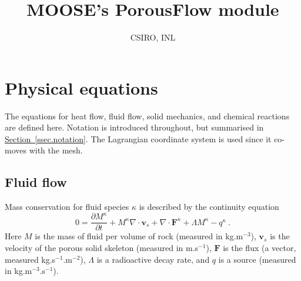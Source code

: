 \documentclass[12pt]{report}
\def\species{\kappa}
\def\flux{\mathbf{F}}
\begin{document}
\title{MOOSE's PorousFlow module}


\author{CSIRO, INL}

\maketitle


\tableofcontents


\chapter{Physical equations}
\label{sec.physical.equations}

The equations for heat flow, fluid flow, solid mechanics, and chemical
reactions are defined here.  Notation is introduced throughout, but
summarised in \hyperref[ssec.notation]{Section~\ref*{ssec.notation}}.  The Lagrangian coordinate
system is used since it co-moves with the mesh.

\section{Fluid flow}

Mass conservation for fluid species $\species$ is described by the continuity
equation
\begin{equation}
0 = \frac{\partial M^{\species}}{\partial t} + M^{\species}\nabla\cdot{\mathbf
  v}_{s} + \nabla\cdot \flux^{\species} + \Lambda M^{\species} - q^{\species} \ .
\label{mass.cons.sp.eqn}
\end{equation}
Here $M$ is the mass of fluid per volume of rock (measured in
kg.m$^{-3}$), ${\mathbf v}_{s}$ is the velocity of the porous solid
skeleton (measured in m.s$^{-1}$), $\flux$ is the flux (a vector,
measured kg.s$^{-1}$.m$^{-2}$), $\Lambda$ is a radioactive decay rate,
and $q$ is a source (measured in kg.m$^{-3}$.s$^{-1}$).
\end{document}
